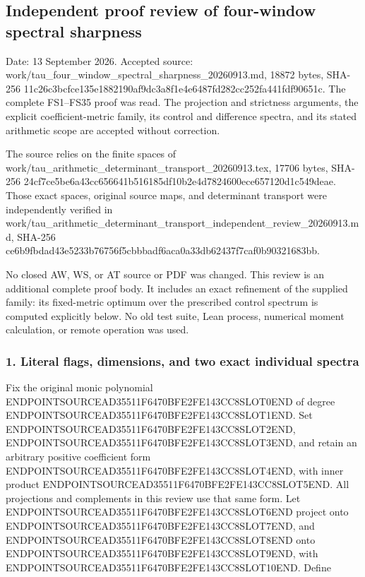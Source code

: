\subsection{Independent proof review of four-window spectral sharpness}\label{endpoint-four_window_sharpness_review--independent-proof-review-of-four-window-spectral-sharpness}

Date: 13 September 2026. Accepted source: work/tau\_four\_window\_spectral\_sharpness\_20260913.md, 18872 bytes, SHA-256 11c26c3bcfce135e1882190af9dc3a8f1e4e6487fd282cc252fa441fdf90651c. The complete FS1--FS35 proof was read. The projection and strictness arguments, the explicit coefficient-metric family, its control and difference spectra, and its stated arithmetic scope are accepted without correction.

The source relies on the finite spaces of work/tau\_arithmetic\_determinant\_transport\_20260913.tex, 17706 bytes, SHA-256 24cf7ce5be6a43cc656641b516185df10b2e4d7824600ece657120d1c549deae. Those exact spaces, original source maps, and determinant transport were independently verified in work/tau\_arithmetic\_determinant\_transport\_independent\_review\_20260913.md, SHA-256 ce6b9fbdad43e5233b76756f5cbbbadf6aca0a33db62437f7caf0b90321683bb.

No closed AW, WS, or AT source or PDF was changed. This review is an additional complete proof body. It includes an exact refinement of the supplied family: its fixed-metric optimum over the prescribed control spectrum is computed explicitly below. No old test suite, Lean process, numerical moment calculation, or remote operation was used.

\subsubsection{1. Literal flags, dimensions, and two exact individual spectra}\label{endpoint-four_window_sharpness_review--literal-flags-dimensions-and-two-exact-individual-spectra}

Fix the original monic polynomial ENDPOINTSOURCEAD35511F6470BFE2FE143CC8SLOT0END of degree ENDPOINTSOURCEAD35511F6470BFE2FE143CC8SLOT1END. Set ENDPOINTSOURCEAD35511F6470BFE2FE143CC8SLOT2END, ENDPOINTSOURCEAD35511F6470BFE2FE143CC8SLOT3END, and retain an arbitrary positive coefficient form ENDPOINTSOURCEAD35511F6470BFE2FE143CC8SLOT4END, with inner product ENDPOINTSOURCEAD35511F6470BFE2FE143CC8SLOT5END. All projections and complements in this review use that same form. Let ENDPOINTSOURCEAD35511F6470BFE2FE143CC8SLOT6END project onto ENDPOINTSOURCEAD35511F6470BFE2FE143CC8SLOT7END, and ENDPOINTSOURCEAD35511F6470BFE2FE143CC8SLOT8END onto ENDPOINTSOURCEAD35511F6470BFE2FE143CC8SLOT9END, with ENDPOINTSOURCEAD35511F6470BFE2FE143CC8SLOT10END. Define

